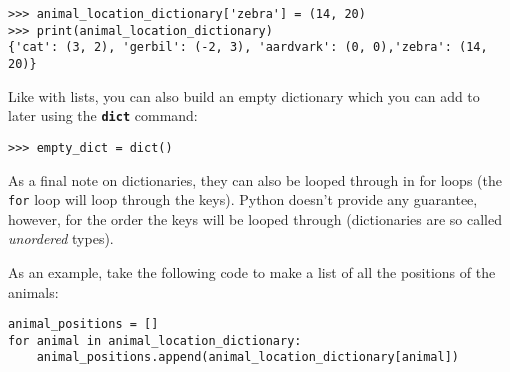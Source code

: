 \begin{lstlisting}[numbers=none]
>>> animal_location_dictionary['zebra'] = (14, 20)
>>> print(animal_location_dictionary)
{'cat': (3, 2), 'gerbil': (-2, 3), 'aardvark': (0, 0),'zebra': (14, 20)}
\end{lstlisting}

Like with lists, you can also build an empty dictionary which you can add to later using the \texttt{\textbf{dict}} command:

\begin{lstlisting}[numbers=none]
>>> empty_dict = dict()
\end{lstlisting}

As a final note on dictionaries, they can also be looped through in for loops (the \texttt{for} loop will loop through the keys). Python doesn't provide any guarantee, however, for the order the keys will be looped through (dictionaries are so called \emph{unordered} types).

As an example, take the following code to make a list of all the positions of the animals:

\begin{lstlisting}
animal_positions = []
for animal in animal_location_dictionary:
	animal_positions.append(animal_location_dictionary[animal])
\end{lstlisting}
	
	